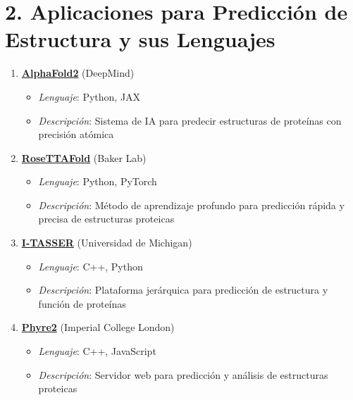 \documentclass[11pt,a4paper]{article}
\begin{document}
  \section*{2. Aplicaciones para Predicción de Estructura y sus Lenguajes}
  
  \begin{enumerate}[noitemsep,topsep=0pt,leftmargin=*]
    \item \textbf{\href{https://github.com/deepmind/alphafold}{AlphaFold2}} (DeepMind)
    \begin{itemize}[noitemsep,topsep=0pt]
      \item \textit{Lenguaje}: Python, JAX
      \item \textit{Descripción}: Sistema de IA para predecir estructuras de proteínas con precisión atómica
    \end{itemize}
    
    \item \textbf{\href{https://github.com/RosettaCommons/RoseTTAFold}{RoseTTAFold}} (Baker Lab)
    \begin{itemize}[noitemsep,topsep=0pt]
      \item \textit{Lenguaje}: Python, PyTorch
      \item \textit{Descripción}: Método de aprendizaje profundo para predicción rápida y precisa de estructuras proteicas
    \end{itemize}
    
    \item \textbf{\href{https://zhanggroup.org/I-TASSER/}{I-TASSER}} (Universidad de Michigan)
    \begin{itemize}[noitemsep,topsep=0pt]
      \item \textit{Lenguaje}: C++, Python
      \item \textit{Descripción}: Plataforma jerárquica para predicción de estructura y función de proteínas
    \end{itemize}
    
    \item \textbf{\href{http://www.sbg.bio.ic.ac.uk/phyre2/}{Phyre2}} (Imperial College London)
    \begin{itemize}[noitemsep,topsep=0pt]
      \item \textit{Lenguaje}: C++, JavaScript
      \item \textit{Descripción}: Servidor web para predicción y análisis de estructuras proteicas
    \end{itemize}
    

\end{enumerate}
\end{document}
